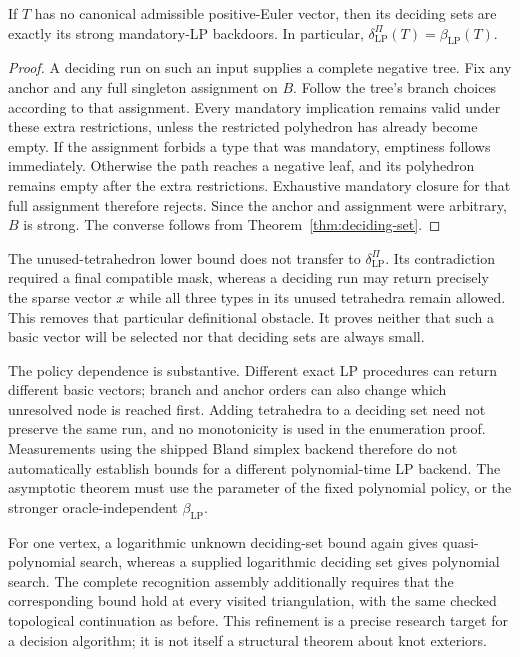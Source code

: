 \begin{proposition}
\label{prop:negative-deciding}
If $T$ has no canonical admissible positive-Euler vector, then its
deciding sets are exactly its strong mandatory-LP backdoors. In
particular, $\delta_{\mathrm{LP}}^{\Pi}(T)=\beta_{\mathrm{LP}}(T)$.
\end{proposition}
\begin{proof}
A deciding run on such an input supplies a complete negative tree.
Fix any anchor and any full singleton assignment on $B$. Follow the
tree's branch choices according to that assignment. Every mandatory
implication remains valid under these extra restrictions, unless the
restricted polyhedron has already become empty. If the assignment
forbids a type that was mandatory, emptiness follows immediately.
Otherwise the path reaches a negative leaf, and its polyhedron remains
empty after the extra restrictions. Exhaustive mandatory closure for
that full assignment therefore rejects. Since the anchor and assignment
were arbitrary, $B$ is strong. The converse follows from
Theorem~\ref{thm:deciding-set}.
\end{proof}

The unused-tetrahedron lower bound does not transfer to
$\delta_{\mathrm{LP}}^{\Pi}$. Its contradiction required a final compatible
mask, whereas a deciding run may return precisely the sparse vector $x$
while all three types in its unused tetrahedra remain allowed. This
removes that particular definitional obstacle. It proves neither that
such a basic vector will be selected nor that deciding sets are always
small.

The policy dependence is substantive. Different exact LP procedures
can return different basic vectors; branch and anchor orders can also
change which unresolved node is reached first. Adding tetrahedra to a
deciding set need not preserve the same run, and no monotonicity is
used in the enumeration proof. Measurements using the shipped Bland
simplex backend therefore do not automatically establish bounds for a
different polynomial-time LP backend. The asymptotic theorem must use
the parameter of the fixed polynomial policy, or the stronger
oracle-independent $\beta_{\mathrm{LP}}$.

For one vertex, a logarithmic unknown deciding-set bound again gives
quasi-polynomial search, whereas a supplied logarithmic deciding set
gives polynomial search. The complete recognition assembly additionally
requires that the corresponding bound hold at every visited
triangulation, with the same checked topological continuation as before.
This refinement is a precise research target for a decision algorithm;
it is not itself a structural theorem about knot exteriors.
